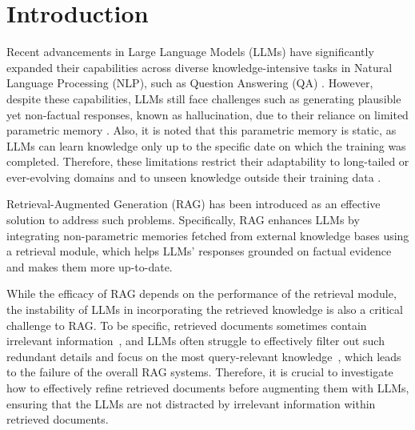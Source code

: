 \section{Introduction}

Recent advancements in Large Language Models (LLMs) \cite{fewshotlearner, GPT-4_technical_report, Llama2} have significantly expanded their capabilities across diverse knowledge-intensive tasks in Natural Language Processing (NLP), such as Question Answering (QA) \cite{NQ, TQA, SQD}. 
However, despite these capabilities, LLMs still face challenges such as generating plausible yet non-factual responses, known as hallucination, due to their reliance on limited parametric memory \cite{DBLP:conf/acl/MallenAZDKH23}. 
Also, it is noted that this parametric memory is static, as LLMs can learn knowledge only up to the specific date on which the training was completed.
Therefore, these limitations restrict their adaptability to long-tailed or ever-evolving domains \cite{Realtime} and to unseen knowledge outside their training data \cite{kalmv}.


%


Retrieval-Augmented Generation (RAG) \cite{DBLP:conf/iclr/KhandelwalLJZL20, RAG, DBLP:conf/icml/BorgeaudMHCRM0L22, replug} has been introduced as an effective solution to address such problems.
Specifically, RAG enhances LLMs by integrating non-parametric memories fetched from external knowledge bases using a retrieval module, which helps LLMs' responses grounded on factual evidence and makes them more up-to-date. 

While the efficacy of RAG depends on the performance of the retrieval module, the instability of LLMs in incorporating the retrieved knowledge is also a critical challenge to RAG.
To be specific, retrieved documents sometimes contain irrelevant information~\cite{das}, and LLMs often struggle to effectively filter out such redundant details and focus on the most query-relevant knowledge~\cite{distractor, distractor2, lostinthemiddle, distractor3}, which leads to the failure of the overall RAG systems.
Therefore, it is crucial to investigate how to effectively refine retrieved documents before augmenting them with LLMs, ensuring that the LLMs are not distracted by irrelevant information within retrieved documents.

